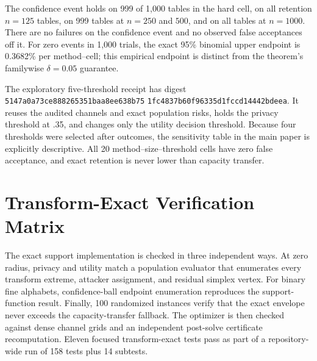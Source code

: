 The confidence event holds on 999 of 1,000 tables in the hard cell, on all
retention $n=125$ tables, on 999 tables at $n=250$ and $500$, and on all tables
at $n=1000$. There are no failures on the confidence event and no observed
false acceptances off it. For zero events in 1,000 trials, the exact 95\%
binomial upper endpoint is 0.3682\% per method--cell; this empirical endpoint is
distinct from the theorem's familywise $\delta=0.05$ guarantee.

\begingroup\raggedright
The exploratory five-threshold receipt has digest
\texttt{5147a0a73ce888265351baa8ee638b75}\allowbreak
\texttt{1fc4837b60f96335d1fccd14442bdeea}. It reuses the audited channels and exact
population risks, holds the privacy threshold at .35, and changes only the
utility decision threshold. Because four thresholds were selected after
outcomes, the sensitivity table in the main paper is explicitly descriptive.
All 20 method--size--threshold cells have zero false acceptance, and exact
retention is never lower than capacity transfer.\par
\endgroup

\section{Transform-Exact Verification Matrix}

The exact support implementation is checked in three independent ways. At zero
radius, privacy and utility match a population evaluator that enumerates every
transform extreme, attacker assignment, and residual simplex vertex. For
binary fine alphabets, confidence-ball endpoint enumeration reproduces the
support-function result. Finally, 100 randomized instances verify that the
exact envelope never exceeds the capacity-transfer fallback. The optimizer is
then checked against dense channel grids and an independent post-solve
certificate recomputation. Eleven focused transform-exact tests pass as part of
a repository-wide run of 158 tests plus 14 subtests.
